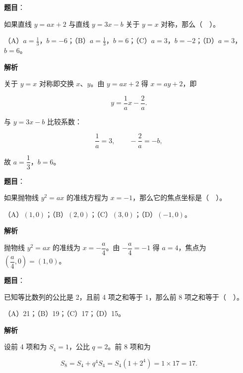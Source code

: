 \begin{answer}

\textbf{题目}：

如果直线 $y=ax+2$ 与直线 $y=3x-b$ 关于 $y=x$ 对称，那么（　）。

（A）$a=\frac13$，$b=-6$；（B）$a=\frac13$，$b=6$；（C）$a=3$，$b=-2$；（D）$a=3$，$b=6$。

\textbf{解析}

关于 $y=x$ 对称即交换 $x$、$y$。由 $y=ax+2$ 得 $x=ay+2$，即

\nopagebreak[4]
\[
y=\frac1a x-\frac2a.
\]

与 $y=3x-b$ 比较系数：

\nopagebreak[4]
\[
\frac1a=3,\qquad -\frac2a=-b,
\]

故 $a=\dfrac13$，$b=6$。


\end{answer}
\begin{answer}

\textbf{题目}：

如果抛物线 $y^2=ax$ 的准线方程为 $x=-1$，那么它的焦点坐标是（　）。

（A）$(1,0)$；（B）$(2,0)$；（C）$(3,0)$；（D）$(-1,0)$。

\textbf{解析}

抛物线 $y^2=ax$ 的准线为 $x=-\dfrac{a}{4}$。由 $-\dfrac{a}{4}=-1$ 得 $a=4$，焦点为 $\left(\dfrac{a}{4},0\right)=(1,0)$。


\end{answer}
\begin{answer}

\textbf{题目}：

已知等比数列的公比是 2，且前 4 项之和等于 1，那么前 8 项之和等于（　）。

（A）21；（B）19；（C）17；（D）15。

\textbf{解析}

设前 4 项和为 $S_4=1$，公比 $q=2$。前 8 项和为

\nopagebreak[4]
\[
S_8=S_4+q^4S_4=S_4(1+2^4)=1\times17=17.
\]


\end{answer}
